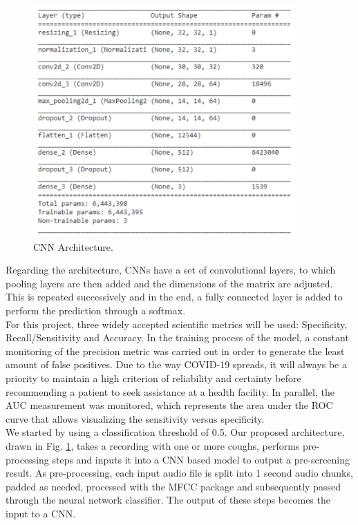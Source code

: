 \documentclass{nle}
\begin{document}
\begin{figure}[htp]
    \centering
    \includegraphics[width=10cm]{CNN}
    \caption{CNN Architecture.}
    \label{nn}
\end{figure}

Regarding the architecture, CNNs have a set of convolutional layers, to which pooling layers are then added and the dimensions of the matrix are adjusted. This is repeated successively and in the end, a fully connected layer is added to perform the prediction through a softmax.\\

For this project, three widely accepted scientific metrics will be used: Specificity, Recall/Sensitivity and Accuracy. In the training process of the model, a constant monitoring of the precision metric was carried out in order to generate the least amount of false positives. Due to the way COVID-19 spreads, it will always be a priority to maintain a high criterion of reliability and certainty before recommending a patient to seek assistance at a health facility. In parallel, the AUC measurement was monitored, which represents the area under the ROC curve that allows visualizing the sensitivity versus specificity.\\

We started by using a classification threshold of 0.5. Our proposed architecture, drawn in Fig. \ref{nn}, takes a recording with one or more coughs, performs pre-processing steps and inputs it into a CNN based model to output a pre-screening result. As pre-processing, each input audio file is split into 1 second audio chunks, padded as needed, processed with the MFCC package and subsequently passed through the neural network classifier. The output of these steps becomes the input to a CNN.\\
\end{document}
